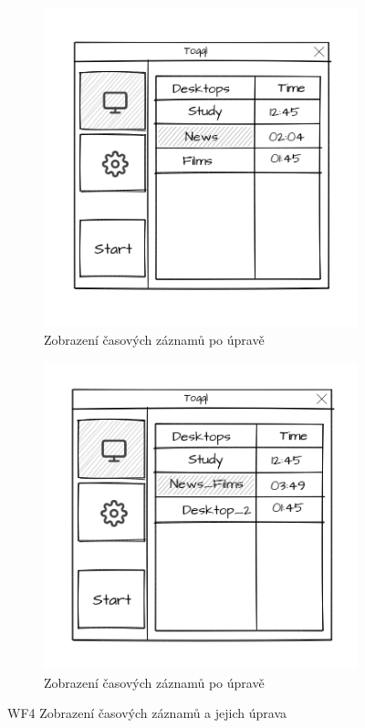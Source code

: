 \documentclass[thesis=B,czech]{FITthesis}[2012/06/26]
\begin{document}
\begin{figure}
\begin{subfigure}[h]{0.5\linewidth}
		\includegraphics[width=\linewidth]{wf_list2.png}
		\caption{Zobrazení časových záznamů po úpravě}
	\end{subfigure}\par\medskip \centering
	\begin{subfigure}[h]{0.5\linewidth}
	\includegraphics[width=\linewidth]{wf_list3.png}
	\caption{Zobrazení časových záznamů po úpravě}
	\end{subfigure}

	\caption{WF4 Zobrazení časových záznamů a jejich úprava}\label{fig:wf_list}
\end{figure}
\end{document}
